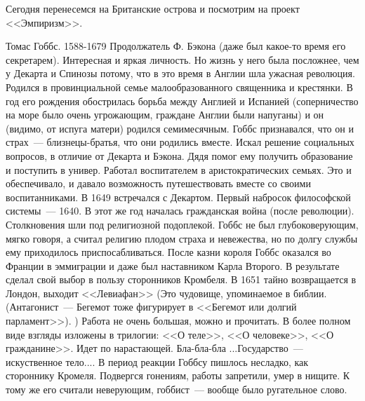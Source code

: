 Сегодня перенесемся на Британские острова и посмотрим на проект <<Эмпиризм>>.

Томас Гоббс. 1588-1679
Продолжатель Ф. Бэкона (даже был какое-то время его секретарем). Интересная и яркая личность. Но жизнь у него была посложнее, чем у Декарта и Спинозы потому, что в это время в Англии шла ужасная революция.
Родился в провинциальной семье малообразованного священника и крестянки. В год его рождения обострилась борьба между Англией и Испанией (соперничество на море было очень угрожающим, граждане Англии были напуганы) и он (видимо, от испуга матери) родился семимесячным. Гоббс признавался, что он и страх~--- близнецы-братья, что они родились вместе. Искал решение социальных вопросов, в отличие от Декарта и Бэкона. Дядя помог ему получить образование и поступить в универ. Работал воспитателем в аристократических семьях. Это и обеспечивало, и давало возможность путешествовать вместе со своими воспитанниками. В 1649 встречался с Декартом. Первый набросок философской системы~--- 1640. В этот же год началась гражданская война (после революции). Столкновения шли под религиозной подоплекой. Гоббс не был глубоковерующим, мягко говоря, а считал религию плодом страха и невежества, но по долгу службы ему приходилось приспосабливаться. После казни короля Гоббс оказался во Франции в эммиграции и даже был наставником Карла Второго. В результате сделал свой выбор в пользу сторонников Кромбеля. 
В 1651 тайно возвращается в Лондон, выходит <<Левиафан>> (Это чудовище, упоминаемое в библии. (Антагонист~--- Бегемот тоже фигурирует в <<Бегемот или долгий парламент>>). ) Работа не очень большая, можно и прочитать. 
В более полном виде взгляды изложены в трилогии: <<О теле>>, <<О человеке>>, <<О гражданине>>. Идет по нарастающей. Бла-бла-бла ...Государство~--- искуственное тело....
В период реакции Гоббсу пишлось несладко, как стороннику Кромеля. Подвергся гонениям, работы запретили, умер в нищите. К тому же его считали неверующим, гоббист~--- вообще было ругательное слово.

